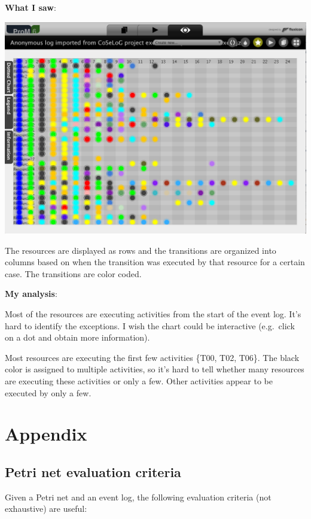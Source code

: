\documentclass[]{article}
\begin{document}
\textbf{What I saw}:

\includegraphics{CoSeLoG_Step_07_Filtered_SocialDots.png}

The resources are displayed as rows and the transitions are organized
into columns based on when the transition was executed by that resource
for a certain case. The transitions are color coded.

\textbf{My analysis}:

Most of the resources are executing activities from the start of the
event log. It's hard to identify the exceptions. I wish the chart could
be interactive (e.g.~click on a dot and obtain more information).

Most resources are executing the first few activities \{T00, T02, T06\}.
The black color is assigned to multiple activities, so it's hard to tell
whether many resources are executing these activities or only a few.
Other activities appear to be executed by only a few.

\section{Appendix}\label{appendix}

\subsection{Petri net evaluation
criteria}\label{petri-net-evaluation-criteria}

Given a Petri net and an event log, the following evaluation criteria
(not exhaustive) are useful:
\end{document}

